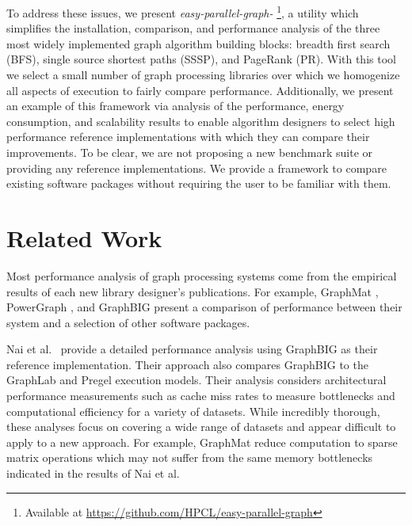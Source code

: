 \documentclass[conference]{IEEEtran}
\begin{document}
To address these issues, we present \emph{easy-parallel-graph\mbox{-\textasteriskcentered}}
\footnote{Available at \url{https://github.com/HPCL/easy-parallel-graph}}, a utility which simplifies the installation, comparison, and performance analysis of the three most widely implemented graph algorithm building blocks: breadth first search (BFS), single source shortest paths (SSSP), and PageRank (PR). With this tool we select a small number of graph processing libraries over which we homogenize all aspects of execution to fairly compare performance. Additionally, we present an example of this framework via analysis of the performance, energy consumption, and scalability results to enable algorithm designers to select high performance reference implementations with which they can compare their improvements. To be clear, we are not proposing a new benchmark suite or providing any reference implementations. We provide a framework to compare existing software packages without requiring the user to be familiar with them.

\section{Related Work}
Most performance analysis of graph processing systems come from the empirical results of each new library designer's publications. For example, GraphMat \cite{Sundaram:2015:GraphMat}, PowerGraph \cite{Gonzalez:2012:Powergraph}, and GraphBIG \cite{Nai:2015:Graphbig} present a comparison of performance between their system and a selection of other software packages.

Nai et al.~\cite{Nai:2016:architectural} provide a detailed performance analysis using GraphBIG as their reference implementation. Their approach also compares GraphBIG to the GraphLab and Pregel execution models. Their analysis considers architectural performance measurements such as cache miss rates to measure bottlenecks and computational efficiency for a variety of datasets. While incredibly thorough, these analyses focus on covering a wide range of datasets and appear difficult to apply to a new approach. For example, GraphMat reduce computation to sparse matrix operations which may not suffer from the same memory bottlenecks indicated in the results of Nai et al.
\end{document}
